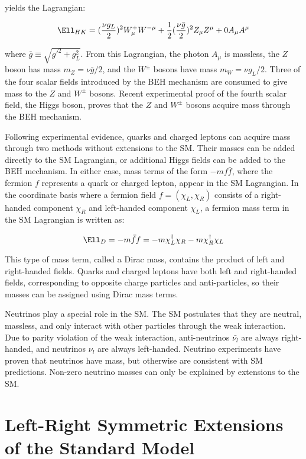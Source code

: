 yields the Lagrangian:

\begin{equation}
	\Ell_{HK} = (\frac{\nu g_{L}}{2})^{2}W^{+}_{\mu}W^{-\mu} + \frac{1}{2}(\frac{\nu \bar{g}}{2})^{2}Z_{\mu}Z^{\mu} + 0A_{\mu}A^{\mu}
\end{equation}

where $\bar{g} \equiv \sqrt{g'^{2} + g^{2}_{L}}$.  From this Lagrangian, the photon $A_{\mu}$ is massless, 
the $Z$ boson has mass $m_{Z} = \nu\bar{g}/2$, and the $W^{\pm}$ bosons have mass $m_{W} = \nu g_{L}/2$.  
Three of the four scalar fields introduced by the BEH mechanism are consumed to give mass to the $Z$ 
and $W^{\pm}$ bosons.  Recent experimental proof of the fourth scalar field, the Higgs boson, 
\cite{} proves that the $Z$ and $W^{\pm}$ bosons acquire mass through the BEH mechanism.

Following experimental evidence, quarks and charged leptons can acquire mass through two methods without 
extensions to the SM.  Their masses can be added directly to the SM Lagrangian, or additional Higgs fields 
can be added to the BEH mechanism.  In either case, mass terms of the form $-mf\bar{f}$, where the fermion 
$f$ represents a quark or charged lepton, appear in the SM Lagrangian.  In the coordinate basis where a 
fermion field $f = (\chi_{L},\chi_{R})$ consists of a right-handed component $\chi_{R}$ and left-handed 
component $\chi_{L}$, a fermion mass term in the SM Lagrangian is written as:

\begin{equation}
	\Ell_{D} = -m\bar{f}f = -m\chi^{\dagger}_{L}\chi_{R} - m\chi^{\dagger}_{R}\chi_{L}
\end{equation}

This type of mass term, called a Dirac mass, contains the product of left and right-handed fields.  Quarks 
and charged leptons have both left and right-handed fields, corresponding to opposite charge particles and 
anti-particles, so their masses can be assigned using Dirac mass terms.

Neutrinos play a special role in the SM.  The SM postulates that they are neutral, massless, and only interact 
with other particles through the weak interaction.  Due to parity violation of the weak interaction, anti-neutrinos $\bar{\nu_{l}}$ 
are always right-handed, and neutrinos $\nu_{l}$ are always 
left-handed.  Neutrino experiments \cite{NOvAresults,mainzPhaseIIResults,t2kResults} have proven that neutrinos 
have mass, but otherwise are consistent with SM predictions.  Non-zero neutrino masses can only be explained 
by extensions to the SM.


\section{Left-Right Symmetric Extensions of the Standard Model}


